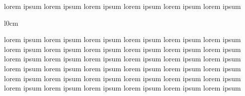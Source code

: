 \documentclass{article}
\begin{document}
lorem ipsum lorem ipsum lorem ipsum lorem ipsum lorem ipsum lorem ipsum
\begin{wrapfigure}[5]{l}{0cm}
\end{wrapfigure}
lorem ipsum lorem ipsum lorem ipsum lorem ipsum lorem ipsum lorem ipsum
lorem ipsum lorem ipsum lorem ipsum lorem ipsum lorem ipsum lorem ipsum
lorem ipsum lorem ipsum lorem ipsum lorem ipsum lorem ipsum lorem ipsum
lorem ipsum lorem ipsum lorem ipsum lorem ipsum lorem ipsum lorem ipsum
lorem ipsum lorem ipsum lorem ipsum lorem ipsum lorem ipsum lorem ipsum
lorem ipsum lorem ipsum lorem ipsum lorem ipsum lorem ipsum lorem ipsum

\lipsum
\end{document}
